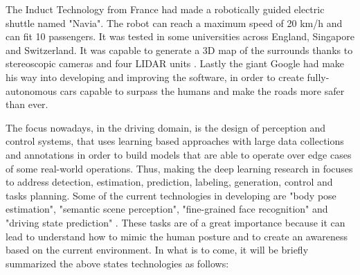 The Induct Technology from France had made a robotically guided electric shuttle named "Navia". The robot can reach a maximum speed of 20 km/h and can fit 10 passengers. It was tested in some universities across England, Singapore and Switzerland. It was capable to generate a 3D map of the surrounds thanks to stereoscopic cameras and four LIDAR units \cite{AutoAI}. Lastly the giant Google had make his way into developing and improving the software, in order to create fully-autonomous cars capable to surpass the humans and make the roads more safer than ever. \par

The focus nowadays, in the driving domain, is the design of perception and control systems, that uses learning based approaches with large data collections and annotations in order to build models that are able to operate over edge cases of some real-world operations. Thus, making the deep learning research in focuses to address detection, estimation, prediction, labeling, generation, control and tasks planning. Some of the current technologies in developing are "body pose estimation", "semantic scene perception", "fine-grained face recognition" and "driving state prediction" \cite{Vision, MIT}. These tasks are of a great importance because it can lead to understand how to mimic the human posture and to create an awareness based on the current environment. In what is to come, it will be briefly summarized the above states technologies as follows: 

